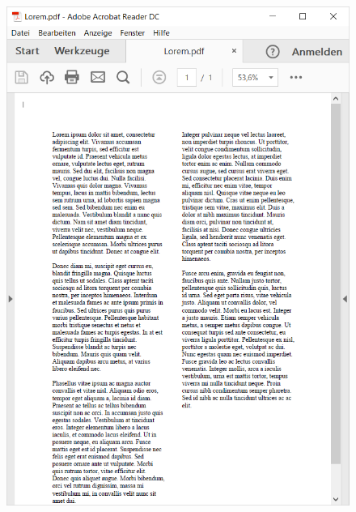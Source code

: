 \begin{figure}[h]
	\begin{minipage}{0.5\textwidth}
		\centering
		\includegraphics[width=\linewidth]{figures/loremNormal.png}
	\end{minipage}\hfill
	\hspace{0.25cm}
	\begin{minipage}{0.5\textwidth}
		\centering

\end{minipage}
\end{figure}
